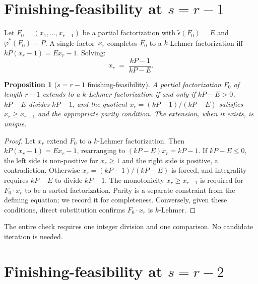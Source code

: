 \documentclass[11pt]{article}
\newtheorem{proposition}[theorem]{Proposition}
\theoremstyle{definition}
\theoremstyle{remark}
\newcommand{\eps}{\tilde{\epsilon}}
\newcommand{\phist}{\tilde{\varphi}^*}
\begin{document}
\section{Finishing-feasibility at $s = r - 1$}

Let $F_0 = (x_1, \ldots, x_{r-1})$ be a partial factorization with
$\eps(F_0) = E$ and $\phist(F_0) = P$.  A single factor~$x_r$ completes
$F_0$ to a $k$-Lehmer factorization iff
$k P (x_r - 1) = E x_r - 1$.  Solving:
\begin{equation}\label{eq:r-1-finish}
  x_r \;=\; \frac{kP - 1}{kP - E}.
\end{equation}

\begin{proposition}[$s = r - 1$ finishing-feasibility]\label{prop:rm1}
A partial factorization $F_0$ of length $r - 1$ extends to a $k$-Lehmer
factorization if and only if $kP - E > 0$, $kP - E$ divides $kP - 1$,
and the quotient $x_r = (kP - 1)/(kP - E)$ satisfies $x_r \ge x_{r-1}$
and the appropriate parity condition.  The extension, when it exists,
is unique.
\end{proposition}

\begin{proof}
Let $x_r$ extend $F_0$ to a $k$-Lehmer factorization.  Then
$kP(x_r - 1) = E x_r - 1$, rearranging to $(kP - E) x_r = kP - 1$.
If $kP - E \le 0$, the left side is non-positive for $x_r \ge 1$ and
the right side is positive, a contradiction.  Otherwise $x_r = (kP -
1)/(kP - E)$ is forced, and integrality requires $kP - E$ to divide
$kP - 1$.  The monotonicity $x_r \ge x_{r-1}$ is required for $F_0
\cdot x_r$ to be a sorted factorization.  Parity is a separate
constraint from the defining equation; we record it for
completeness.  Conversely, given these conditions, direct substitution
confirms $F_0 \cdot x_r$ is $k$-Lehmer.
\end{proof}

The entire check requires one integer division and one comparison.  No
candidate iteration is needed.


\section{Finishing-feasibility at $s = r - 2$}
\end{document}
